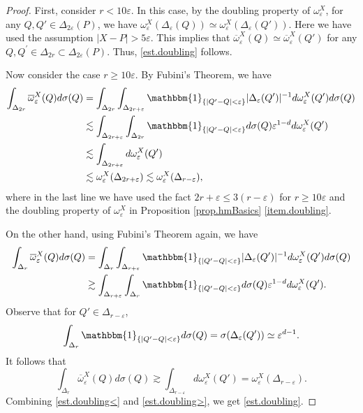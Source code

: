 \documentclass[reqno,12pt]{amsart} %
\theoremstyle{definition}
\theoremstyle{remark}
\numberwithin{equation}{section}
\newcommand{\e}{\varepsilon}
\begin{document}
\begin{proof}
    First, consider $r<10\e$. In this case, by the doubling property of $\omega_\e^X$, for any $Q, Q' \in \Delta_{2\e}(P)$, we have $\omega_\e^X(\Delta_\e(Q)) \simeq  \omega_\e^X(\Delta_\e(Q'))$. 
    Here we have used the assumption $|X-P|>5\e$.
    This implies that $\overline{\omega}^X_\e(Q) \simeq \overline{\omega}^X_\e(Q') $ for any $Q, Q^\prime\in \Delta_{2r} \subset \Delta_{2\e}(P)$. Thus, \eqref{est.doubling} follows.

    Now consider the case $r\ge 10\e$. By Fubini's Theorem, we have
    \begin{equation}\label{est.doubling<}
        \begin{aligned}
            \int_{\Delta_{2r}} \overline{\omega}^X_\e(Q) d\sigma(Q) & = \int_{\Delta_{2r}} \int_{\Delta_{2r+\e}} \mathbbm{1}_{\{|Q'-Q|<\e\}} |\Delta_\e(Q')|^{-1} d\omega_\e^X(Q') d\sigma(Q) \\
            & \lesssim \int_{\Delta_{2r+\e}} \int_{\Delta_{2r}} \mathbbm{1}_{\{|Q'-Q|<\e\}} d\sigma(Q) \e^{1-d} d\omega_\e^X(Q') \\
            & \lesssim \int_{\Delta_{2r+\e}} d\omega_\e^X(Q') \\
            & \lesssim \omega_\e^X(\Delta_{2r+\e}) \lesssim \omega_\e^X(\Delta_{r-\e}),
        \end{aligned}
    \end{equation}
    where in the last line we have used the fact $2r+\e \le 3(r-\e)$ for $r\ge 10\e$ and the doubling property of $\omega_\e^X$ in Proposition \ref{prop.hmBasics} \ref{item.doubling}.

    On the other hand, using Fubini's Theorem again, we have
    \begin{equation}
    \begin{aligned}
        \int_{\Delta_{r}} \overline{\omega}^X_\e(Q) d\sigma(Q) & = \int_{\Delta_{r}} \int_{\Delta_{r+\e}} \mathbbm{1}_{\{|Q'-Q|<\e\}} |\Delta_\e(Q')|^{-1} d\omega_\e^X(Q') d\sigma(Q) \\
        & \gtrsim \int_{\Delta_{r+\e}} \int_{\Delta_{r}} \mathbbm{1}_{\{|Q'-Q|<\e\}} d\sigma(Q) \e^{1-d} d\omega_\e^X(Q').
    \end{aligned}
    \end{equation}
    Observe that for $Q'\in \Delta_{r-\e}$,
    \begin{equation}
        \int_{\Delta_{r}} \mathbbm{1}_{\{|Q'-Q|<\e\}} d\sigma(Q) = \sigma(\Delta_\e(Q')) \simeq \e^{d-1}.
    \end{equation}
    It follows that
    \begin{equation}\label{est.doubling>}
        \int_{\Delta_{r}} \overline{\omega}^X_\e(Q) d\sigma(Q) \gtrsim \int_{\Delta_{r-\e}} d\omega_\e^X(Q') = \omega_\e^X(\Delta_{r-\e}).
    \end{equation}
    Combining \eqref{est.doubling<} and \eqref{est.doubling>}, we get \eqref{est.doubling}.
\end{proof}
\end{document}
